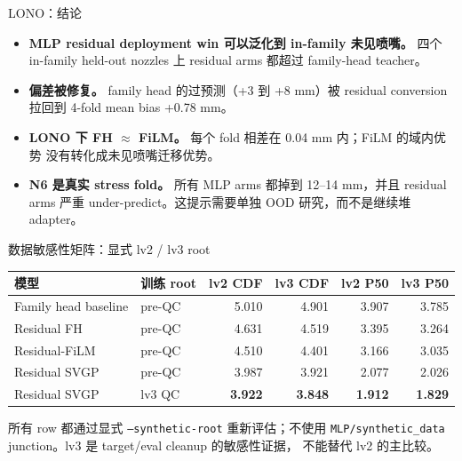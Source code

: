 \documentclass[UTF8,aspectratio=169]{ctexbeamer}
\newcommand{\good}[1]{\textcolor{green!45!black}{#1}}
\begin{document}
\begin{frame}{LONO：结论}
\small
\begin{itemize}\setlength\itemsep{3pt}
  \item \textbf{MLP residual deployment win 可以泛化到 in-family 未见喷嘴。}
        四个 in-family held-out nozzles 上 residual arms 都超过 family-head teacher。
  \item \textbf{偏差被修复。} family head 的过预测（+3 到 +8 mm）被 residual conversion
        拉回到 4-fold mean bias \good{+0.78 mm}。
  \item \textbf{LONO 下 FH $\approx$ FiLM。} 每个 fold 相差在 0.04 mm 内；FiLM 的域内优势
        没有转化成未见喷嘴迁移优势。
  \item \textbf{N6 是真实 stress fold。} 所有 MLP arms 都掉到 12--14 mm，并且 residual arms
        严重 under-predict。这提示需要单独 OOD 研究，而不是继续堆 adapter。
\end{itemize}
\end{frame}

\begin{frame}{数据敏感性矩阵：显式 lv2 / lv3 root}
\small
\begin{center}
\scriptsize
\renewcommand{\arraystretch}{1.12}
\setlength{\tabcolsep}{4pt}
\begin{tabular}{@{}llrrrr@{}}
\toprule
\textbf{模型} & \textbf{训练 root} & \textbf{lv2 CDF} & \textbf{lv3 CDF} & \textbf{lv2 P50} & \textbf{lv3 P50} \\
\midrule
Family head baseline & pre-QC & 5.010 & 4.901 & 3.907 & 3.785 \\
Residual FH          & pre-QC & 4.631 & 4.519 & 3.395 & 3.264 \\
Residual-FiLM        & pre-QC & 4.510 & 4.401 & 3.166 & 3.035 \\
Residual SVGP        & pre-QC & 3.987 & 3.921 & 2.077 & 2.026 \\
\rowcolor{winrow}
Residual SVGP        & lv3 QC & \textbf{3.922} & \textbf{3.848} & \textbf{1.912} & \textbf{1.829} \\
\bottomrule
\end{tabular}
\end{center}
\vspace{0.25em}
\footnotesize
所有 row 都通过显式 \texttt{--synthetic-root} 重新评估；不使用
\texttt{MLP/synthetic\_data} junction。lv3 是 target/eval cleanup 的敏感性证据，
不能替代 lv2 的主比较。
\end{frame}
\end{document}
